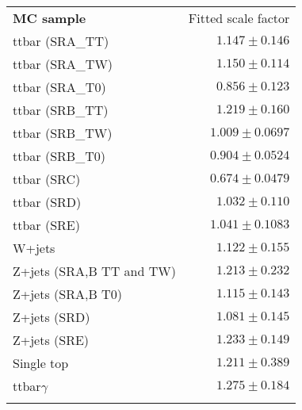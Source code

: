 \begin{tabular*}{\textwidth}{@{\extracolsep{\fill}}lr}
      \noalign{\smallskip}\hline\noalign{\smallskip}
      {\bf MC sample}           & Fitted scale factor        \\[-0.05cm]
      \noalign{\smallskip}\hline\noalign{\smallskip}
      ttbar (SRA\_TT) &   $1.147 \pm 0.146$              \\
      ttbar (SRA\_TW) &   $1.150 \pm 0.114$              \\
      ttbar (SRA\_T0) &   $0.856 \pm 0.123$              \\
      \noalign{\smallskip}\hline\noalign{\smallskip}
      ttbar (SRB\_TT) &   $1.219 \pm 0.160$              \\
      ttbar (SRB\_TW) &   $1.009 \pm 0.0697$              \\
      ttbar (SRB\_T0) &   $0.904 \pm 0.0524$              \\
      \noalign{\smallskip}\hline\noalign{\smallskip}
      ttbar (SRC) &   $0.674 \pm 0.0479$              \\
      ttbar (SRD) &   $1.032 \pm 0.110$              \\
      ttbar (SRE) &   $1.041 \pm 0.1083$              \\
      \noalign{\smallskip}\hline\noalign{\smallskip}
      W+jets &   $1.122 \pm 0.155$              \\
      \noalign{\smallskip}\hline\noalign{\smallskip}
      Z+jets (SRA,B TT and TW) &   $1.213 \pm 0.232$              \\
      Z+jets (SRA,B T0) &   $1.115 \pm 0.143$              \\
      Z+jets (SRD) &   $1.081 \pm 0.145$              \\
      Z+jets (SRE) &   $1.233 \pm 0.149$              \\
      \noalign{\smallskip}\hline\noalign{\smallskip}
      Single top &   $1.211 \pm 0.389$              \\
      ttbar$\gamma$ &   $1.275 \pm 0.184$              \\
      \noalign{\smallskip}\hline\noalign{\smallskip}
    \end{tabular*}